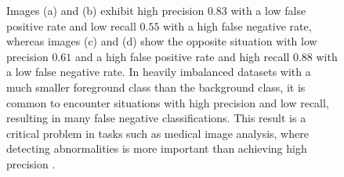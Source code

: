 \begin{figure}[H]
    \caption[Precision and Recall]{Images (a) and (b) exhibit high precision $0.83$ with a low false positive rate and low recall $0.55$ with a high false negative rate, whereas images (c) and (d) show the opposite situation with low precision $0.61$ and a high false positive rate and high recall $0.88$ with a low false negative rate.  In heavily imbalanced datasets with a much smaller foreground class than the background class, it is common to encounter situations with high precision and low recall, resulting in many false negative classifications. This result is a critical problem in tasks such as medical image analysis, where detecting abnormalities is more important than achieving high precision \cite{powers2020evaluation}.}
    \label{precision_recall}
\end{figure}

